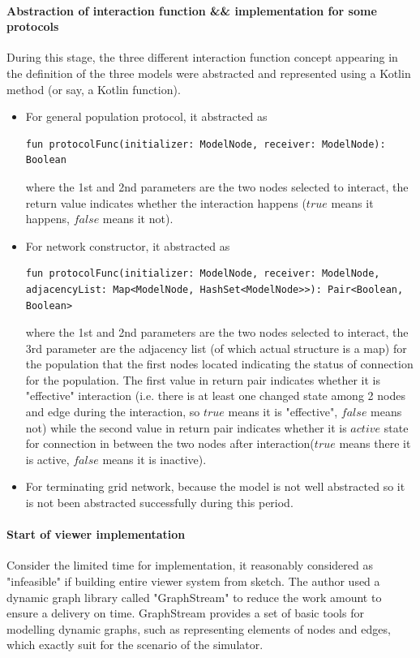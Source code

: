 \paragraph{Abstraction of interaction function \&\& implementation for some protocols}
During this stage, the three different interaction function concept appearing in the definition of the three models
were abstracted and represented using a Kotlin method (or say, a Kotlin function).
\begin{itemize}
  \item For general population protocol, it abstracted as
  \begin{lstlisting}[caption = {Abstraction for population protocol interaction function}, style = mykotlin]
      fun protocolFunc(initializer: ModelNode, receiver: ModelNode): Boolean
  \end{lstlisting}
   where the 1st and 2nd parameters are the two nodes selected to interact, the return value indicates whether the interaction happens ($true$ means it happens, $false$ means it not).
   \item For network constructor, it abstracted as
   \begin{lstlisting}[caption = {Abstraction for network constructor interaction function}, style = mykotlin]
      fun protocolFunc(initializer: ModelNode, receiver: ModelNode, adjacencyList: Map<ModelNode, HashSet<ModelNode>>): Pair<Boolean, Boolean>
   \end{lstlisting}
   where the 1st and 2nd parameters are the two nodes selected to interact, the 3rd parameter are the adjacency list (of which actual structure is a map) for the population that the
   first nodes located indicating the status of connection for the population. The first value in return pair indicates whether it is "effective" interaction
    (i.e. there is at least one changed state among 2 nodes and edge during the interaction, so $true$ means it is "effective", $false$ means not) while the
   second value in return pair indicates whether it is $active$ state for connection in between the two nodes after interaction($true$ means there it is active, $false$ means it is inactive).
   \item For terminating grid network, because the model is not well abstracted so it is not been abstracted successfully during this period.
\end{itemize}
\paragraph{Start of viewer implementation}
Consider the limited time for implementation, it reasonably considered as "infeasible" if building entire viewer system from sketch. The author used a dynamic
graph library called "GraphStream" \cite{GraphStream} to reduce the work amount to ensure a delivery on time.
GraphStream provides a set of basic tools for modelling dynamic graphs, such as representing elements of nodes and edges, which exactly suit for the scenario of the simulator.
